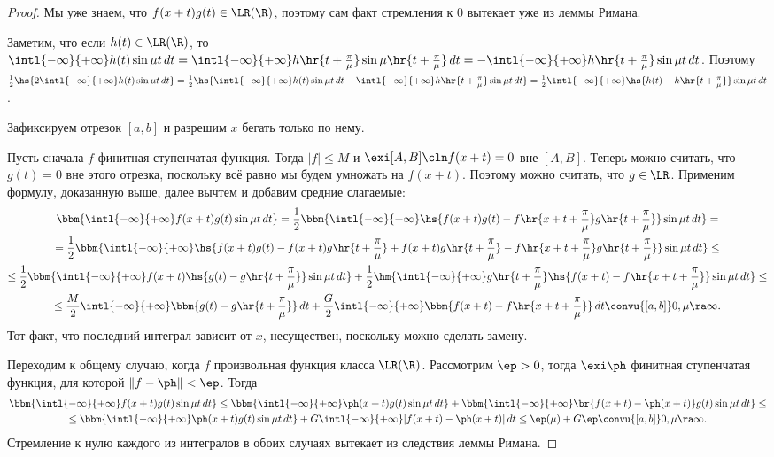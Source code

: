 \documentclass[a4paper]{article}
\newcommand{\tpm}{\hr{t + \frac{\pi}{\mu}}}
\newcommand{\xtpm}{\hr{x + t + \frac{\pi}{\mu}}}
\newcommand{\intlii}{\intl{-\infty}{+\infty}}
\begin{document}
\begin{proof}
Мы уже знаем, что $f(x+t)g(t) \in\LR(\R)$, поэтому сам факт стремления к 0 вытекает уже из леммы Римана.

Заметим, что если $h(t) \in\LR(\R)$, то $\intlii h(t) \sin \mu t \,d t = \intlii h \tpm \sin \mu
\tpm\,d t = -\intlii h\tpm \sin \mu t \,d t$. Поэтому $\frac{1}{2}\hs{2\intlii h(t)\sin \mu t
\,d t} = \frac{1}{2}\hs{\intlii h(t) \sin \mu t\,d t - \intlii h\tpm \sin \mu t \,d t}=
\frac{1}{2}\intlii\hs{h(t) - h\tpm}\sin \mu t \,d t$.

Зафиксируем отрезок $[a,b]$ и разрешим $x$ бегать только по нему.

Пусть сначала $f$ финитная ступенчатая функция. Тогда $|f| \le M$ и $\exi [A,B]\cln f(x+t) = 0$ вне $[A,B]$. Теперь можно считать, что
$g(t) = 0$ вне этого отрезка, поскольку всё равно мы будем умножать на $f(x+t)$. Поэтому можно считать, что $g \in\LR$. Применим формулу, доказанную выше, далее
вычтем и добавим средние слагаемые:
\begin{multline}
\label{common.riemann.lemma}
\bbm{\intlii f(x+t)g(t)\sin \mu t \,d t} = \frac{1}{2}\bbm{\intlii\hs{f(x+t)g(t)-f\xtpm g\tpm}\sin \mu t \,d t}=\\
=\frac{1}{2}\bbm{\intlii\hs{f(x+t)g(t) - f(x+t)g\tpm + f(x+t)g\tpm-f\xtpm g\tpm}\sin \mu t \,d t}\le\\
\le\frac{1}{2}\bbm{\intlii f(x+t)\hs{g(t) - g\tpm}\sin \mu t\,d t} + \frac{1}{2}\hm{\intlii g\tpm\hs{f(x+t)-f\xtpm}
\sin \mu t \,d t}\le\\
\le\frac{M}{2}\intlii \bbm{g(t) - g\tpm}\,d t + \frac{G}{2}\intlii \bbm{f(x+t)-f\xtpm}\,dt
\convu{[a,b]} 0, \mu \ra \infty.
\end{multline}
Тот факт, что последний интеграл зависит от $x$, несуществен, поскольку можно сделать замену.

Переходим к общему случаю, когда $f$ произвольная функция класса $\LR(\R)$. Рассмотрим $\ep >0$,
тогда $\exi \ph$ финитная ступенчатая функция, для которой $\|f - \ph\| < \ep$. Тогда
\begin{multline*}
\bbm{\intlii f(x+t)g(t)\sin \mu t \,d t} \le \bbm{\intlii \ph(x+t)g(t)\sin \mu t\,dt}+
\bbm{\intlii \br{f(x+t)-\ph(x+t)}g(t)\sin \mu t \,d t} \le\\\le \bbm{\intlii \ph(x+t)g(t)\sin \mu t \,dt}
+ G \intlii |f(x+t)-\ph(x+t)|\,d t \le \ep(\mu) + G\ep \convu{[a,b]} 0, \mu \ra \infty.
\end{multline*}
Стремление к нулю каждого из интегралов в обоих случаях вытекает из следствия леммы Римана.
\end{proof}
\end{document}
